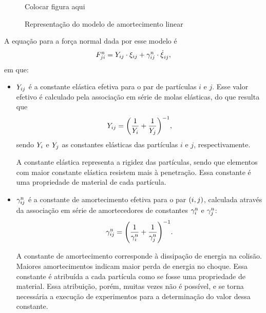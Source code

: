 \begin{figure}[h]
	\caption{Representação do modelo de amortecimento linear}
	\begin{center}
		\alert{Colocar figura aqui}
	\end{center}
	\label{fig:linear_dashpot_force}
\end{figure}

A equação para a força normal dada por esse modelo é
\begin{equation} \label{eq:linear_dashpot_force}
	\normalForceScalarji = \elasticModulusij\cdot\overlapij + \normalDampingConstantij\cdot\overlapDerivativeij,
\end{equation}
em que:
\begin{itemize}
	\item \({Y}_{i j}\) é a constante elástica efetiva para o par de partículas \(i\) e \(j\). Esse valor efetivo é calculado pela associação em série de molas elásticas, do que resulta que
	\begin{equation*}
		\elasticModulusij = \pqty{\dfrac{1}{\elasticModulusi} + \dfrac{1}{\elasticModulusj}}^{-1},
	\end{equation*}
	sendo \({Y}_{i}\) e \({Y}_{j}\) as constantes elásticas das partículas \(i\) e \(j\), respectivamente.

	A constante elástica representa a rigidez das partículas, sendo que elementos com maior constante elástica resistem mais à penetração. Essa constante é uma propriedade de material de cada partícula.

	\item \({\gamma}_{i j}^{\text{n}}\) é a constante de amortecimento efetiva para o par \(\pqty{i, j}\), calculada através da associação em série de amortecedores de constantes \({\gamma}_{i}^{\text{n}}\) e \({\gamma}_{j}^{\text{n}}\):
	\begin{equation*}
		\normalDampingConstantij = \pqty{\dfrac{1}{\normalDampingConstanti} + \dfrac{1}{\normalDampingConstantj}}^{-1}.
	\end{equation*}

	A constante de amortecimento corresponde à dissipação de energia na colisão. Maiores amortecimentos indicam maior perda de energia no choque. Essa constante é atribuída a cada partícula como se fosse uma propriedade de material. Essa atribuição, porém, muitas vezes não é possível, e se torna necessária a execução de experimentos para a determinação do valor dessa constante.
\end{itemize}


